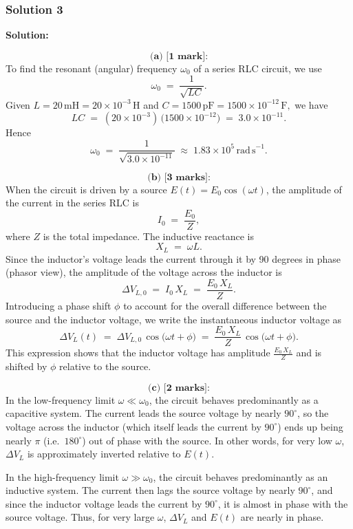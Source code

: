 \documentclass{article}
\begin{document}
\subsubsection{Solution 3}
\textbf{Solution:}

\[
\textbf{(a) [1 mark]:}
\]
To find the resonant (angular) frequency \(\omega_0\) of a series RLC circuit, we use
\[
\omega_0 \;=\; \frac{1}{\sqrt{LC}}.
\]
Given \(L = 20\,\mathrm{mH} = 20\times 10^{-3}\,\mathrm{H}\) and 
\(C = 1500\,\mathrm{pF} = 1500\times 10^{-12}\,\mathrm{F},\) 
we have
\[
LC \;=\; (20\times 10^{-3})\,\bigl(1500\times 10^{-12}\bigr) 
\;=\; 3.0\times 10^{-11}.
\]
Hence
\[
\omega_0 
\;=\; \frac{1}{\sqrt{3.0\times 10^{-11}}} 
\;\approx\; 1.83 \times 10^{5}\,\mathrm{rad\,s}^{-1}.
\]

\[
\textbf{(b) [3 marks]:}
\]
When the circuit is driven by a source 
\(E(t) = E_0\cos(\omega t)\),
the amplitude of the current in the series RLC is 
\[
I_0 \;=\; \frac{E_0}{Z},
\]
where \(Z\) is the total impedance.  The inductive reactance is 
\[
X_L \;=\; \omega L.
\]
Since the inductor’s voltage leads the current through it by 90 degrees in phase (phasor view), the amplitude of the voltage across the inductor is
\[
\Delta V_{L,0} \;=\; I_0\,X_L 
\;=\; \frac{E_0\,X_L}{Z}.
\]
Introducing a phase shift \(\phi\) to account for the overall difference between the source and the inductor voltage, we write the instantaneous inductor voltage as
\[
\Delta V_L(t) 
\;=\; \Delta V_{L,0}\,\cos\bigl(\omega t + \phi\bigr)
\;=\; \frac{E_0\,X_L}{Z}\,\cos\bigl(\omega t + \phi\bigr).
\]
This expression shows that the inductor voltage has amplitude 
\(\frac{E_0\,X_L}{Z}\)
and is shifted by \(\phi\) relative to the source.

\[
\textbf{(c) [2 marks]:}
\]
In the low-frequency limit \(\omega \ll \omega_0\), the circuit behaves predominantly as a capacitive system.  The current leads the source voltage by nearly \(90^\circ\), so the voltage across the inductor (which itself leads the current by \(90^\circ\)) ends up being nearly \(\pi\) (i.e.\ \(180^\circ\)) out of phase with the source.  In other words, for very low \(\omega\), \(\Delta V_L\) is approximately inverted relative to \(E(t)\).

In the high-frequency limit \(\omega \gg \omega_0\), the circuit behaves predominantly as an inductive system.  The current then lags the source voltage by nearly \(90^\circ\), and since the inductor voltage leads the current by \(90^\circ\), it is almost in phase with the source voltage.  Thus, for very large \(\omega\), \(\Delta V_L\) and \(E(t)\) are nearly in phase.
\end{document}
